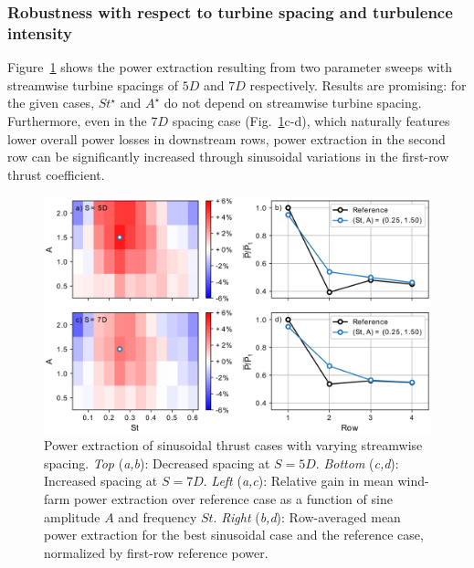 \documentclass[wes, manuscript]{copernicus}
\begin{document}
\subsubsection{Robustness with respect to turbine spacing and turbulence intensity}

Figure~\ref{fig:sinus_spacing} shows the power extraction resulting from two parameter sweeps with streamwise turbine spacings of $5D$ and $7D$ respectively. Results are promising: for the given cases, $St^\star$ and $A^\star$  do not depend on streamwise turbine spacing. Furthermore, even in the $7D$ spacing case (Fig.~\ref{fig:sinus_spacing}c-d), which naturally features lower overall power losses in downstream rows, power extraction in the second row can be significantly increased through sinusoidal variations in the first-row thrust coefficient. 
\begin{figure}
	\centering
	\includegraphics[width=\textwidth]{gains_combined2.eps}
	\caption{Power extraction of sinusoidal thrust cases with varying streamwise spacing. \emph{Top} (\emph{a,b}): Decreased spacing at $S = 5D$. \emph{Bottom} (\emph{c,d}): Increased spacing at $S = 7D$.  \emph{Left} (\emph{a,c}): Relative gain in mean wind-farm power extraction over reference case as a function of sine amplitude $A$ and frequency $St$. \emph{Right} (\emph{b,d}): Row-averaged mean power extraction for the best sinusoidal case and the reference case, normalized by first-row reference power. \label{fig:sinus_spacing} }
\end{figure}
\end{document}
